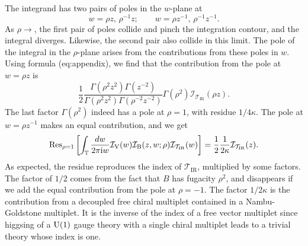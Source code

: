 The integrand has two pairs of poles in the $w$-plane at
\begin{equation}
    w  =  \rho z,  \,  \rho^{-1}z;
    \quad\quad
    w  =  \rho z^{-1},  \,  \rho^{-1}z^{-1}.
\end{equation}
As $\rho\to $, the first pair of poles collide and pinch
the integration contour, and the integral diverges. Likewise, the
second pair also collide in this limit. The pole of the integral in
the $\rho$-plane arises from the contributions from these poles in
$w$. Using formula (eq:appendix), we find that the contribution from
the pole at $w=\rho z$ is
\begin{equation}
    \frac{1}{2}
    \frac{\Gamma(\rho^{2}z^{2})\Gamma(z^{-2})}{\Gamma(\rho^{2}z^{2})\Gamma(\rho^{-2}z^{-2})}
    \Gamma(\rho^{2})
    \mathcal{I}_{\mathcal{T}_{\mathrm{IR}}}(\rho z).
\end{equation}
The last factor $\Gamma(\rho^{2})$ indeed has a pole at $\rho=1$,
with residue $1/4\kappa$. The pole at $w=\rho z^{-1}$ makes an equal
contribution, and we get
\begin{equation}
    \mathrm{Res}_{\rho=1}
    \left[
      \int_{\mathbb{T}}\frac{dw}{2\pi \mathrm{i} w}
      \mathcal{I}_{\mathrm{V}}(w)
      \mathcal{I}_{\mathrm{B}}(z,w;\rho)
      \mathcal{I}_{\mathcal{T}_{\mathrm{IR}}}(w)
    \right]
      =
        \frac{1}{2}  \frac{1}{2\kappa}
        \mathcal{I}_{\mathcal{T}_{\mathrm{IR}}}(z).
\end{equation}
As expected, the residue reproduces the index of $\mathcal{T}_{\mathrm{IR}}$,
multiplied by some factors. The factor of $1/2$ comes from the fact
that $B$ has fugacity $\rho^{2}$, and disappears if we add the equal
contribution from the pole at $\rho=-1$. The factor $1/2\kappa$
is the contribution from a decoupled free chiral multiplet contained
in a Nambu-Goldstone multiplet. It is the inverse of the index of
a free vector multiplet since higgsing of a $\mathrm{U}(1)$ gauge theory with
a single chiral multiplet leads to a trivial theory whose index is
one.

